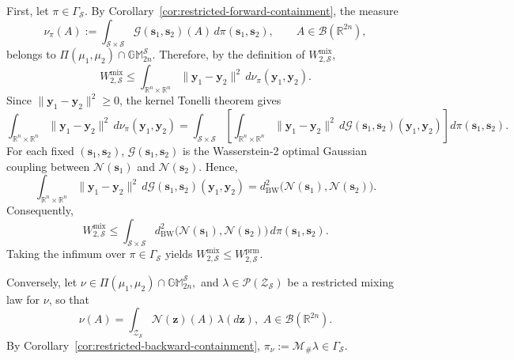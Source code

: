 \documentclass[opre,sglanonrev]{informs4}
\newcommand{\mbGM}{\mathbb{GM}}
\newcommand{\bs}{\bm{s}}
\newcommand{\by}{\bm{y}}
\newcommand{\bz}{\bm{z}}
\begin{document}
{\begin{APPENDICES}
First, let \(\pi\in\Gamma_{\mathcal S}\). By
Corollary~\ref{cor:restricted-forward-containment}, the measure
\[
\nu_\pi(A)
:=
\int_{\mathcal S\times\mathcal S}
\mathcal G(\bs_1,\bs_2)(A)\,d\pi(\bs_1,\bs_2),
\qquad A\in\mathcal B(\mathbb R^{2n}),
\]
belongs to $\Pi(\mu_1,\mu_2)\cap\mbGM_{2n}^{\mathcal S}.$
Therefore, by the definition of \(W_{2,\mathcal S}^{\mathrm{mix}}\),
\[
W_{2,\mathcal S}^{\mathrm{mix}}
\le
\int_{\mathbb R^n\times\mathbb R^n}
\|\by_1-\by_2\|^2\,d\nu_\pi(\by_1,\by_2).
\]
Since \(\|\by_1-\by_2\|^2\ge0\), the kernel Tonelli theorem gives
\[
\int_{\mathbb R^n\times\mathbb R^n}
\|\by_1-\by_2\|^2\,d\nu_\pi(\by_1,\by_2)
=
\int_{\mathcal S\times\mathcal S}
\left[
\int_{\mathbb R^n\times\mathbb R^n}
\|\by_1-\by_2\|^2\,d\mathcal G(\bs_1,\bs_2)(\by_1,\by_2)
\right]
d\pi(\bs_1,\bs_2).
\]
For each fixed \((\bs_1,\bs_2)\), \(\mathcal G(\bs_1,\bs_2)\) is the
Wasserstein-2 optimal Gaussian coupling between \(\mathcal N(\bs_1)\) and
\(\mathcal N(\bs_2)\). Hence,
\[
\int_{\mathbb R^n\times\mathbb R^n}
\|\by_1-\by_2\|^2\,d\mathcal G(\bs_1,\bs_2)(\by_1,\by_2)
=
d^2_{\mathrm{BW}}\bigl(\mathcal N(\bs_1),\mathcal N(\bs_2)\bigr).
\]
Consequently,
\[
W_{2,\mathcal S}^{\mathrm{mix}}
\le
\int_{\mathcal S\times\mathcal S}
d^2_{\mathrm{BW}}\bigl(\mathcal N(\bs_1),\mathcal N(\bs_2)\bigr)\,d\pi(\bs_1,\bs_2).
\]
Taking the infimum over \(\pi\in\Gamma_{\mathcal S}\) yields $W_{2,\mathcal S}^{\mathrm{mix}}
\le
W_{2,\mathcal S}^{\mathrm{prm}}.$

Conversely, let $\nu\in\Pi(\mu_1,\mu_2)\cap\mbGM_{2n}^{\mathcal S},$
and \(\lambda\in\mathcal P(\mathcal Z_{\mathcal S})\) be a restricted
mixing law for \(\nu\), so that 
\[\nu(A)
=
\int_{\mathcal Z_{\mathcal S}}\mathcal N(\bz)(A)\,\lambda(d\bz),
\,\,
A\in\mathcal B(\mathbb R^{2n}).
\]
By Corollary~\ref{cor:restricted-backward-containment}, $\pi_\nu:=\mathcal M_{\#}\lambda\in\Gamma_{\mathcal S}.$



\end{APPENDICES}}
\end{document}
